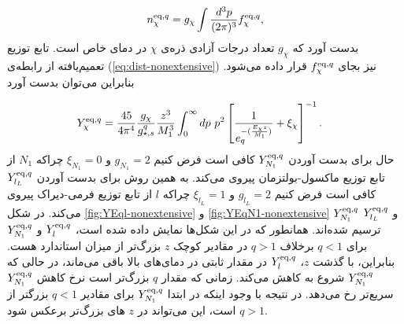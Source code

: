 \documentclass[a4paper]{book}
\begin{document}
{\footnotesize\begin{align}
		n_{\chi}^{{\rm eq},q} = g_{\chi} \int \frac{d^3 p}{(2 \pi)^3} f_{\chi}^{{\rm eq},q},
		\label{eq:def-n}
\end{align}}
بدست آورد که {\footnotesize$g_{\chi}$} تعداد درجات آزادی ذره‌ی {\footnotesize$\chi$} در دمای خاص است. تابع توزیع تعمیم‌یافته از رابطه‌ی (\ref{eq:dist-nonextensive}) نیز بجای {\footnotesize$f_{\chi}^{{\rm eq},q}$} قرار داده می‌شود. بنابراین می‌توان بدست آورد
\par
\vspace{-0.5cm}
{\footnotesize\begin{align}
	Y_{\chi}^{{\rm eq},q} &= \frac{45}{4 \pi^4} \frac{g_{\chi}}{g_{\star,s}^q} \frac{z^3}{M_1^3} \int_{0}^{\infty} dp\ p^2 \left[ \frac{1}{e_q^{-(\frac{E_{\chi} z}{M_1})}}+\xi_{\chi}\right]^{-1}.
	\label{eq:YEq}
\end{align}}
حال برای بدست آوردن {\footnotesize$Y_{N_1}^{{\rm eq},q}$} کافی است فرض کنیم {\footnotesize$g_{N_1}=2$} و {\footnotesize$\xi_{N_1}=0$} چراکه {\footnotesize$N_1$} از تابع توزیع ماکسول-بولتزمان پیروی می‌کند. به همین روش برای بدست آوردن {\footnotesize$Y_{{l_L}}^{{\rm eq},q}$} کافی است فرض کنیم {\footnotesize$g_{{l_L}}=2$} و {\footnotesize$\xi_{{l_L}}=1$} چراکه {\footnotesize$l$} از تابع توزیع فرمی-دیراک پیروی می‌کند.
در شکل \ref{fig:YEql-nonextensive} و \ref{fig:YEqN1-nonextensive} {\footnotesize$Y_{N_1}^{{\rm eq},q}$} و {\footnotesize$Y_{{l_L}}^{{\rm eq},q}$} ترسیم شده‌اند. همانطور که در این شکل‌ها نمایش داده شده است، {\footnotesize$Y^{{\rm eq},q}_{l}$} و {\footnotesize$Y^{{\rm eq},q}_{N_1}$} برای {\footnotesize$q<1$} برخلاف {\footnotesize$q>1$} در مقادیر کوچک {\footnotesize$z$} بزرگ‌تر از میزان استاندارد هست.
بنابراین، با گذشت {\footnotesize$z$}، {\footnotesize$Y^{{\rm eq},q}_{l}$} در مقدار ثابتی در دمای‌های بالا باقی می‌ماند، در حالی که {\footnotesize$Y^{{\rm eq},q}_{N_1}$} شروع به کاهش می‌کند. زمانی که مقدار {\footnotesize$q$} بزرگ‌تر است نرخ کاهش {\footnotesize$Y^{{\rm eq},q}_{N_1}$} سریع‌تر رخ می‌دهد. در نتیجه با وجود اینکه در ابتدا {\footnotesize$Y^{{\rm eq},q}_{N_1}$} برای مقادیر {\footnotesize$q<1$} بزرگتر از {\footnotesize$q>1$} است، این می‌تواند در {\footnotesize$z$} های بزرگ‌تر برعکس شود.
\end{document}
